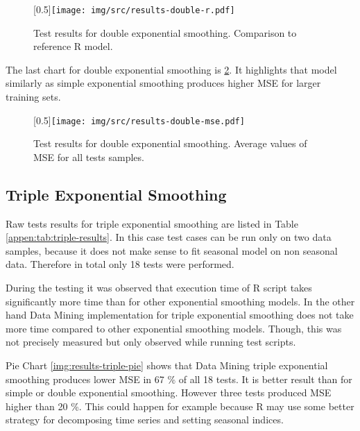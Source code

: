         \begin{figure}[H]
            \begin{center}
                \scalebox{0.65}[0.5]{\texttt{[image: img/src/results-double-r.pdf]}}
                \caption{Test results for double exponential smoothing. Comparison to reference R model.}
                \label{img:results-double-r}
            \end{center}
        \end{figure}

        The last chart for double exponential smoothing is \ref{img:results-double-mse}.
        It highlights that model similarly as simple exponential smoothing produces higher MSE for larger training sets.

        \begin{figure}[H]
            \begin{center}
                \scalebox{0.65}[0.5]{\texttt{[image: img/src/results-double-mse.pdf]}}
                \caption{Test results for double exponential smoothing. Average values of MSE for all tests samples.}
                \label{img:results-double-mse}
            \end{center}
        \end{figure}

        \subsection{Triple Exponential Smoothing} \label{sec:results-triple}
        Raw tests results for triple exponential smoothing are listed in Table \ref{appen:tab:triple-results}. In
        this case test cases can be run only on two data samples, because it does not make sense to fit seasonal
        model on non seasonal data. Therefore in total only 18 tests were performed.

        During the testing it was observed that execution time of R script takes significantly more time than for other
        exponential smoothing models. In the other hand Data Mining implementation for triple exponential smoothing
        does not take more time compared to other exponential smoothing models. Though, this was not precisely measured
        but only observed while running test scripts.

        Pie Chart \ref{img:results-triple-pie} shows that Data Mining triple exponential smoothing produces lower MSE
        in 67 \% of all 18 tests. It is better result than for simple or double exponential smoothing. However
        three tests produced MSE higher than 20 \%. This could happen for example because R may use some better strategy
        for decomposing time series and setting seasonal indices.

